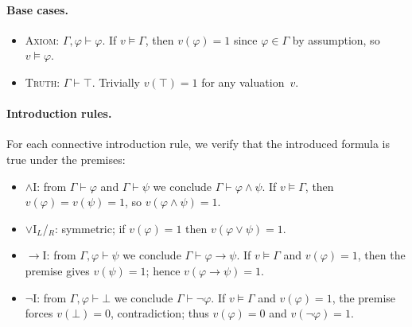 \documentclass[acmtocl,review,anonymous]{acmart}
\newcommand{\proves}{\vdash}
\begin{document}
\paragraph{Base cases.}
\begin{itemize}
  \item \textsc{Axiom}: $\Gamma, \varphi \proves \varphi$.
    If $v \models \Gamma$, then $v(\varphi)=1$ since $\varphi \in \Gamma$
    by assumption, so $v \models \varphi$.

  \item \textsc{Truth}: $\Gamma \proves \top$.
    Trivially $v(\top) = 1$ for any valuation~$v$.
\end{itemize}

\paragraph{Introduction rules.}
For each connective introduction rule, we verify that the introduced
formula is true under the premises:
\begin{itemize}
  \item $\wedge$I: from $\Gamma \proves \varphi$ and $\Gamma \proves \psi$
    we conclude $\Gamma \proves \varphi \wedge \psi$.
    If $v \models \Gamma$, then $v(\varphi)=v(\psi)=1$, so
    $v(\varphi \wedge \psi) = 1$.

  \item $\vee$I$_L$/$_R$: symmetric; if $v(\varphi)=1$ then
    $v(\varphi \vee \psi) = 1$.

  \item $\to$I: from $\Gamma, \varphi \proves \psi$ we conclude
    $\Gamma \proves \varphi \to \psi$.
    If $v \models \Gamma$ and $v(\varphi)=1$, then the premise gives
    $v(\psi)=1$; hence $v(\varphi \to \psi) = 1$.

  \item $\neg$I: from $\Gamma, \varphi \proves \bot$ we conclude
    $\Gamma \proves \neg\varphi$.
    If $v \models \Gamma$ and $v(\varphi)=1$, the premise forces
    $v(\bot)=0$, contradiction; thus $v(\varphi)=0$ and
    $v(\neg\varphi)=1$.
\end{itemize}
\end{document}
